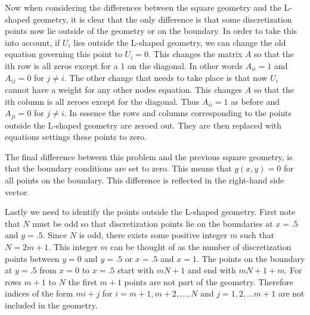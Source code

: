 \documentclass[11pt, oneside, titlepage]{article}
\begin{document}
\begin{enumerate}
        Now when considering the differences between the square geometry and
        the L-shaped geometry, it is clear that the only difference is that
        some discretization points now lie outside of the geometry or on the
        boundary.
        In order to take this into account, if $U_i$ lies outside the L-shaped
        geometry, we can change the old equation governing this point to $U_i = 0$.
        This changes the matrix $A$ so that the ith row is all zeros except
        for a 1 on the diagonal.
        In other words $A_{ii} = 1$ and $A_{ij} = 0$ for $j \neq i$.
        The other change that needs to take place is that now
        $U_i$ cannot have a weight for any other nodes equation.
        This changes $A$ so that the ith column is all zeroes except for the
        diagonal.
        Thus $A_{ii} = 1$ as before and $A_{ji} = 0$ for $j \neq i$.
        In essence the rows and columns corresponding to the points outside
        the L-shaped geometry are zeroed out.
        They are then replaced with equations settings these points to zero.

        The final difference between this problem and the previous square
        geometry, is that the boundary conditions are set to zero.
        This means that $g(x,y) = 0$ for all points on the boundary.
        This difference is reflected in the right-hand side vector.

        Lastly we need to identify the points outside the L-shaped geometry.
        First note that $N$ must be odd so that discretization points lie on
        the boundaries at $x = .5$ and $y = .5$.
        Since $N$ is odd, there exists some positive integer $m$ such that
        $N = 2m + 1$.
        This integer $m$ can be thought of as the number of discretization
        points between $y = 0$ and $y = .5$ or $x = .5$ and $x = 1$.
        The points on the boundary at $y = .5$ from $x = 0$ to $x = .5$ start
        with $mN + 1$ and end with $mN + 1 + m$.
        For rows $m + 1$ to $N$ the first $m + 1$ points are not part of the geometry.
        Therefore indices of the form $mi + j$ for $i = m+1, m+2, \ldots, N$ and
        $j=1, 2, \ldots m + 1$ are not included in the geometry.


\end{enumerate}
\end{document}

